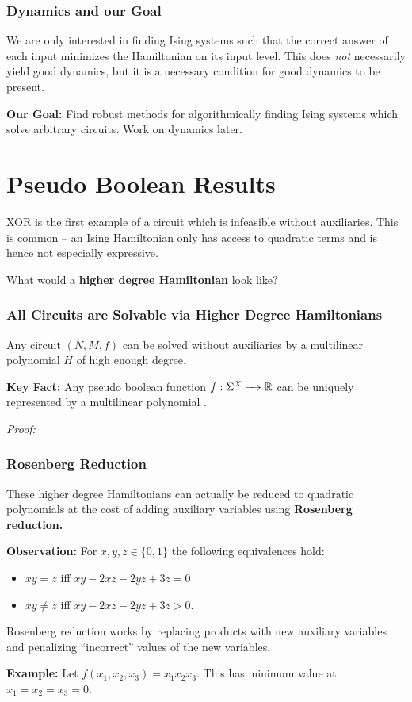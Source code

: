 \documentclass[8pt, mathserif, notheorems]{beamer}
\begin{document}
\begin{frame}[c]\frametitle{Dynamics and our Goal}
  We are only interested in finding Ising systems such that the correct answer of each input minimizes the Hamiltonian on its input level. This does \textit{not} necessarily yield good dynamics, but it is a necessary condition for good dynamics to be present.

  \bigskip

 \textbf{Our Goal:} Find robust methods for algorithmically finding Ising systems which solve arbitrary circuits. Work on dynamics later.
\end{frame}

\section{Pseudo Boolean Results}
\begin{frame}[t]
  XOR is the first example of a circuit which is infeasible without auxiliaries. This is common -- an Ising Hamiltonian only has access to quadratic terms and is hence not especially expressive.

  \bigskip

  What would a \textbf{higher degree Hamiltonian} look like?
\end{frame}
\begin{frame}[t]\frametitle{All Circuits are Solvable via Higher Degree Hamiltonians}
  \begin{prop}
    Any circuit $(N,M,f)$ can be solved without auxiliaries by a multilinear polynomial $H$ of high enough degree.
  \end{prop}

  \bigskip

  \textbf{Key Fact:} Any pseudo boolean function $f:\Sigma^X \to \bR$ can be uniquely represented by a multilinear polynomial \cite{boroshammer}.

  \bigskip

  \textit{Proof:}
\end{frame}
\begin{frame}[t]\frametitle{Rosenberg Reduction}
  These higher degree Hamiltonians can actually be reduced to quadratic polynomials at the cost of adding auxiliary variables using \textbf{Rosenberg reduction.}

  \bigskip

  \textbf{Observation:} For $x,y,z \in \{0,1\}$ the following equivalences hold:
  \begin{itemize}
    \item $xy = z$ iff $xy - 2xz - 2yz + 3z = 0$
    \item $xy \neq z$ iff $xy - 2xz - 2yz + 3z > 0$.
  \end{itemize}

  \bigskip

  Rosenberg reduction works by replacing products with new auxiliary variables and penalizing ``incorrect'' values of the new variables.

  \bigskip

  \textbf{Example:} Let $f(x_1,x_2,x_3) = x_1x_2x_3$. This has minimum value at $x_1 = x_2 = x_3 = 0$.
\end{frame}
\end{document}
